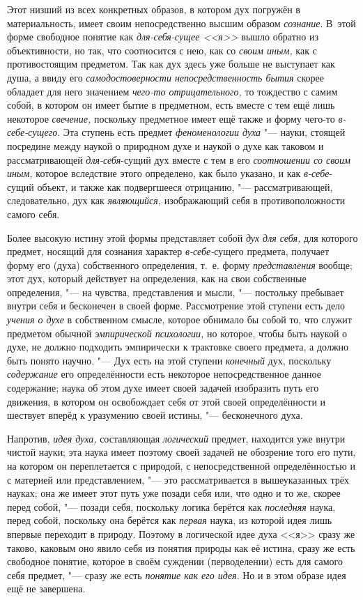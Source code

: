 Этот низший из всех конкретных образов, в котором дух погружён
в материальность, имеет своим непосредственно высшим образом
{\em сознание}. В~этой
форме свободное понятие как
{\em для-себя-сущее <<я>>}
вышло обратно из объективности, но так, что соотносится с
нею, как со {\em своим иным,}
как с противостоящим предметом. Так как дух здесь уже больше
не выступает как душа, а ввиду его
{\em самодостоверности
непосредственность бытия} скорее обладает для него значением
{\em чего-то отрицательного,}
то тождество с самим собой, в котором он имеет бытие в
предметном, есть вместе с тем ещё лишь некоторое
{\em свечение,} поскольку
предметное имеет ещё также и форму чего-то
{\em в-себе-сущего}. Эта
ступень есть предмет {\em феноменологии
духа} "--- науки, стоящей посредине между наукой о природном
духе и наукой о духе как таковом и рассматривающей
{\em для-себя}-сущий
дух вместе с тем в его {\em соотношении
со своим иным,} которое вследствие этого определено, как
было указано, и как
{\em в-себе}-сущий
объект, и также как подвергшееся отрицанию, "---
рассматривающей, следовательно, дух как
{\em являющийся,}
изображающий себя в противоположности самого себя.

Более высокую истину этой формы представляет собой
{\em дух для себя,} для
которого предмет, носящий для сознания характер
{\em в-себе-}сущего
предмета, получает форму его (духа) собственного определения, т.~е. форму
{\em представления}
вообще; этот дух, который действует на определения, как на
свои собственные определения, "--- на чувства, представления и
мысли, "--- постольку пребывает внутри себя и бесконечен в
своей форме. Рассмотрение этой ступени есть дело
{\em учения о духе} в
собственном смысле, которое обнимало бы собой то, что служит предметом
обычной {\em эмпирической психологии,}
но которое, чтобы быть наукой о духе, не должно подходить
эмпирически к трактовке своего предмета, а должно быть понято научно. "---
Дух есть на этой ступени
{\em конечный} дух,
поскольку {\em содержание}
его определённости есть некоторое непосредственное данное
содержание; наука об этом духе имеет своей задачей изобразить путь его
движения, в котором он освобождает себя от этой своей определённости и
шествует вперёд к уразумению своей истины, "--- бесконечного
духа.

Напротив, {\em идея духа,}
составляющая
{\em логический} предмет,
находится уже внутри чистой науки; эта наука имеет поэтому своей задачей не
обозрение того его пути, на котором он переплетается с природой, с
непосредственной определённостью и с материей или
представлением, "--- это рассматривается в вышеуказанных трёх
науках; она же имеет этот путь уже позади себя или, что одно и то же,
скорее перед собой, "--- позади себя, поскольку логика берётся
как {\em последняя}
наука, перед собой, поскольку она берётся как
{\em первая} наука, из
которой идея лишь впервые переходит в природу. Поэтому в логической идее
духа <<я>> сразу же таково, каковым оно явило себя из понятия природы как её
истина, сразу же есть свободное понятие, которое в своём суждении
(перводелении) есть для самого себя предмет, "--- сразу же есть
{\em понятие как его идея}.
Но и в этом образе идея ещё не завершена.

